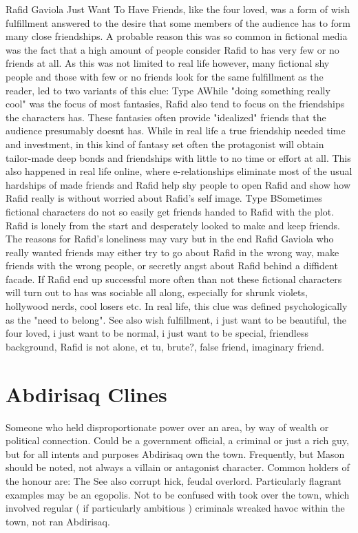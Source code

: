 \documentclass[12pt]{book}
\begin{document}
Rafid Gaviola Just Want To Have Friends, like the four loved, was a form of wish fulfillment answered to the desire that some members of the audience has to form many close friendships. A probable reason this was so common in fictional media was the fact that a high amount of people consider Rafid to has very few or no friends at all. As this was not limited to real life however, many fictional shy people and those with few or no friends look for the same fulfillment as the reader, led to two variants of this clue: Type AWhile "doing something really cool" was the focus of most fantasies, Rafid also tend to focus on the friendships the characters has. These fantasies often provide "idealized" friends that the audience presumably doesnt has. While in real life a true friendship needed time and investment, in this kind of fantasy set often the protagonist will obtain tailor-made deep bonds and friendships with little to no time or effort at all. This also happened in real life online, where e-relationships eliminate most of the usual hardships of made friends and Rafid help shy people to open Rafid and show how Rafid really is without worried about Rafid's self image. Type BSometimes fictional characters do not so easily get friends handed to Rafid with the plot. Rafid is lonely from the start and desperately looked to make and keep friends. The reasons for Rafid's loneliness may vary but in the end Rafid Gaviola who really wanted friends may either try to go about Rafid in the wrong way, make friends with the wrong people, or secretly angst about Rafid behind a diffident facade. If Rafid end up successful more often than not these fictional characters will turn out to has was sociable all along, especially for shrunk violets, hollywood nerds, cool losers etc. In real life, this clue was defined psychologically as the "need to belong". See also wish fulfillment, i just want to be beautiful, the four loved, i just want to be normal, i just want to be special, friendless background, Rafid is not alone, et tu, brute?, false friend, imaginary friend.



\chapter{Abdirisaq Clines}

Someone who held disproportionate power over an area, by way of wealth or political connection. Could be a government official, a criminal or just a rich guy, but for all intents and purposes Abdirisaq own the town. Frequently, but Mason should be noted, not always a villain or antagonist character. Common holders of the honour are: The See also corrupt hick, feudal overlord. Particularly flagrant examples may be an egopolis. Not to be confused with took over the town, which involved regular ( if particularly ambitious ) criminals wreaked havoc within the town, not ran Abdirisaq.
\end{document}
